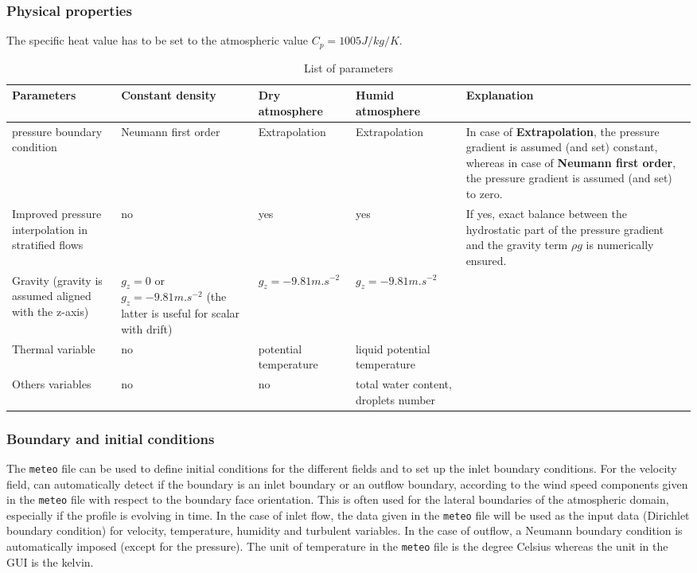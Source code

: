 \subsubsection{Physical properties}
%
The specific heat value has to be set to the atmospheric value
$C_{p}=1005 J/kg/K$.
%
\begin{table}[ht]\label{tab:param_list}
\begin{center}
\begin{tabular}{|p{80pt}|p{70pt}|p{70pt}|p{80pt}|p{100pt}|}
\hline
\textbf{Parameters} & \textbf{Constant density} & \textbf{Dry atmosphere} & \textbf{Humid atmosphere} & \textbf{Explanation} \\
\hline
pressure boundary condition & Neumann first order & Extrapolation & Extrapolation &
In case of \textbf{Extrapolation}, the pressure gradient is assumed (and set) constant, whereas in case of \textbf{Neumann first order},
the pressure gradient is assumed (and set) to zero. \\
\hline
Improved pressure interpolation in stratified flows & no & yes & yes & If yes, exact balance between the hydrostatic part of the pressure gradient and the gravity term $\rho g$ is numerically ensured. \\
\hline
Gravity (gravity is assumed aligned with the z-axis) & $g_z=0$ or $g_z=-9.81 m.s^{-2}$ (the latter is useful for scalar with drift) & $g_z=-9.81 m.s^{-2}$ & $g_z=-9.81 m.s^{-2}$ &  \\
\hline
Thermal variable & no & potential temperature & liquid potential temperature &  \\
\hline
Others variables & no & no & total water content, droplets number &  \\
\hline
\end{tabular}\label{tab1}
\caption[List of parameters]{List of parameters}
\end{center}
\end{table}
%
\subsubsection{Boundary and initial conditions}\label{sec:atmo_BCs}
%
The \texttt{meteo} file can be used to define initial conditions for the
different fields and to set up the inlet boundary conditions. For the velocity
field, \CS can automatically detect if the boundary is an inlet boundary or an
outflow boundary, according to the wind speed components given in the
\texttt{meteo} file with respect to the boundary face orientation. This is often
used for the lateral boundaries of the atmospheric domain, especially if the
profile is evolving in time. In the case of inlet flow, the data given in the
\texttt{meteo} file will be used as the input data (Dirichlet boundary condition)
for velocity, temperature, humidity and turbulent variables. In the case of
outflow, a Neumann boundary condition is automatically imposed (except for the
pressure). The unit of temperature in the \texttt{meteo} file is the degree
Celsius whereas the unit in the GUI is the kelvin.

